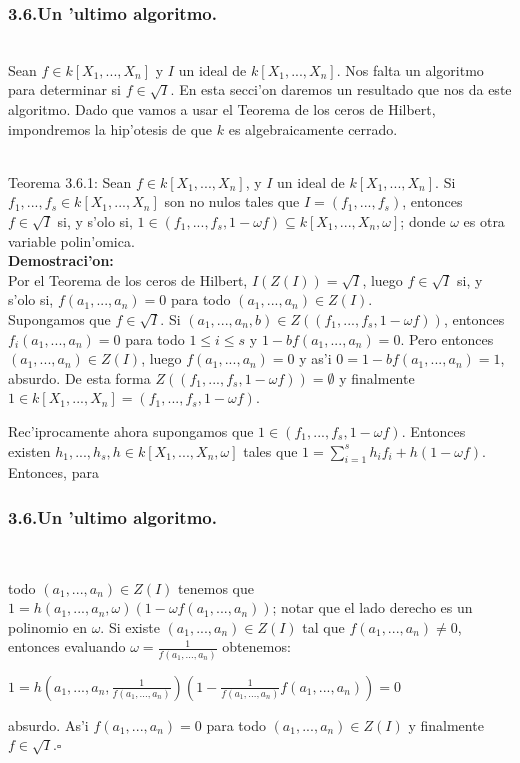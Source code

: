 \documentclass[10pt]{beamer}
\begin{document}
\begin{frame}
\frametitle{3.6.Un 'ultimo algoritmo.}\\
Sean $f \in k[X_1,...,X_n]$ y $I$ un ideal de $k[X_1,...,X_n]$. Nos falta un algoritmo para determinar si $f \in \sqrt{I}$. En esta secci'on daremos un resultado que nos da este algoritmo. Dado que vamos a usar el Teorema de los ceros de Hilbert, impondremos la hip'otesis de que $k$ es algebraicamente cerrado.\\
\\ 
\begin{block}{Teorema 3.6.1:}
Sean $f \in k[X_1,...,X_n]$, y $I$ un ideal de $k[X_1,...,X_n]$. Si $f_1,...,f_s \in k[X_1,...,X_n]$ son no nulos tales que $I=(f_1,...,f_s)$, entonces $f \in \sqrt{I}$ si, y s'olo si, $1 \in (f_1,...,f_s,1-\omega f)\subseteq k[X_1,...,X_n,\omega]$; donde $\omega$ es otra variable polin'omica.\\
\textbf{Demostraci'on:}\\
Por el Teorema de los ceros de Hilbert, $I(Z(I))=\sqrt{I}$, luego $f \in \sqrt{I}$ si, y s'olo si, $f(a_1,...,a_n)=0$ para todo $(a_1,...,a_n) \in Z(I)$.\\
Supongamos que $f \in \sqrt{I}$. Si $(a_1,...,a_n,b) \in Z((f_1,...,f_s,1-\omega f))$, entonces $f_i(a_1,...,a_n)=0$ para todo $1 \leq i \leq s$ y $1-bf(a_1,...,a_n)=0$. Pero entonces $(a_1,...,a_n)\in Z(I)$, luego $f(a_1,...,a_n)=0$ y as'i $0=1-bf(a_1,...,a_n)=1$, absurdo. De esta forma $Z((f_1,...,f_s,1-\omega f))= \emptyset$ y finalmente $1 \in k[X_1,...,X_n]=(f_1,...,f_s,1-\omega f)$.\

Rec'iprocamente ahora supongamos que $1 \in (f_1,...,f_s,1-\omega f)$. Entonces existen $h_1,...,h_s,h \in k[X_1,...,X_n, \omega]$ tales que $1= \sum_{i=1}^{s}{h_if_i}+h(1-\omega f)$. Entonces, para
\end{block}
\end{frame}

\begin{frame}
\frametitle{3.6.Un 'ultimo algoritmo.}\\
\begin{block}{}
todo $(a_1,...,a_n) \in Z(I)$ tenemos que $1=h(a_1,...,a_n, \omega)(1-\omega f(a_1,...,a_n))$; notar que el lado derecho es un polinomio en $\omega$. Si existe $(a_1,...,a_n) \in Z(I)$ tal que $f(a_1,...,a_n) \not = 0$, entonces evaluando $\omega = \frac{1}{f(a_1,...,a_n)}$ obtenemos:\\
 \begin{center}
$\displaystyle 1=h\left(a_1,...,a_n, \frac{1}{f(a_1,...,a_n)}\right)\left(1-\frac{1}{f(a_1,...,a_n)} f(a_1,...,a_n)\right)=0$\\ 
\end{center}
absurdo. As'i $f(a_1,...,a_n)=0$ para todo $(a_1,...,a_n) \in Z(I)$ y finalmente $f \in \sqrt{I}$.\hfill $\square$\\
\end{block}
\vspace{5cm}
\end{frame}
\end{document}
